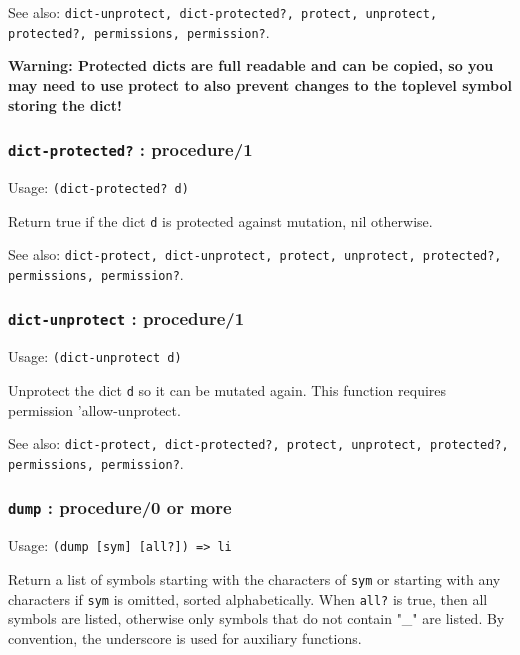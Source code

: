 \documentclass[
]{article}
\newcommand{\passthrough}[1]{#1}
\begin{document}
See also:
\passthrough{\lstinline!dict-unprotect, dict-protected?, protect, unprotect, protected?, permissions, permission?!}.

\textbf{Warning: Protected dicts are full readable and can be copied, so
you may need to use protect to also prevent changes to the toplevel
symbol storing the dict!}

\hypertarget{dict-protected-procedure1}{%
\subsubsection{\texorpdfstring{\texttt{dict-protected?} :
procedure/1}{dict-protected? : procedure/1}}\label{dict-protected-procedure1}}

Usage: \passthrough{\lstinline!(dict-protected? d)!}

Return true if the dict \passthrough{\lstinline!d!} is protected against
mutation, nil otherwise.

See also:
\passthrough{\lstinline!dict-protect, dict-unprotect, protect, unprotect, protected?, permissions, permission?!}.

\hypertarget{dict-unprotect-procedure1}{%
\subsubsection{\texorpdfstring{\texttt{dict-unprotect} :
procedure/1}{dict-unprotect : procedure/1}}\label{dict-unprotect-procedure1}}

Usage: \passthrough{\lstinline!(dict-unprotect d)!}

Unprotect the dict \passthrough{\lstinline!d!} so it can be mutated
again. This function requires permission 'allow-unprotect.

See also:
\passthrough{\lstinline!dict-protect, dict-protected?, protect, unprotect, protected?, permissions, permission?!}.

\hypertarget{dump-procedure0-or-more}{%
\subsubsection{\texorpdfstring{\texttt{dump} : procedure/0 or
more}{dump : procedure/0 or more}}\label{dump-procedure0-or-more}}

Usage: \passthrough{\lstinline!(dump [sym] [all?]) => li!}

Return a list of symbols starting with the characters of
\passthrough{\lstinline!sym!} or starting with any characters if
\passthrough{\lstinline!sym!} is omitted, sorted alphabetically. When
\passthrough{\lstinline!all?!} is true, then all symbols are listed,
otherwise only symbols that do not contain "\_" are listed. By
convention, the underscore is used for auxiliary functions.
\end{document}
